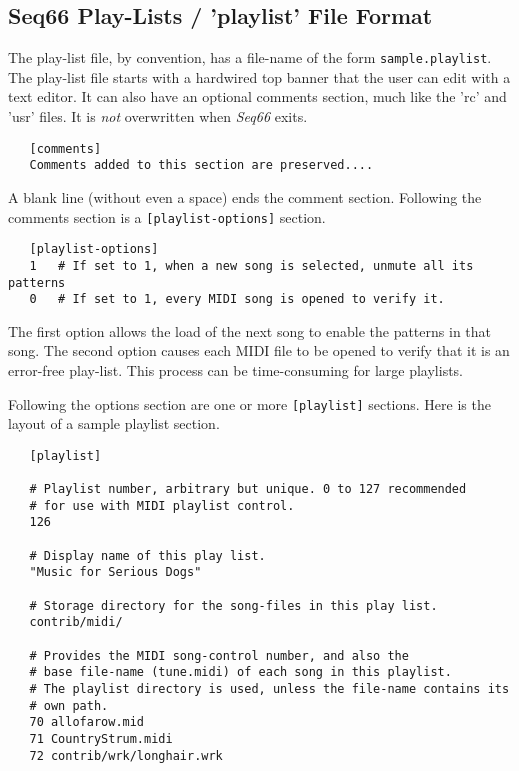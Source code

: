 \subsection{Seq66 Play-Lists / 'playlist' File Format}
\label{subsec:playlist_setup}

   The play-list file, by convention, has a file-name of the form
   \texttt{sample.playlist}.
   The play-list file starts with a hardwired top banner that the user can edit
   with a text editor.  It can also have an optional comments section, much
   like the 'rc' and 'usr' files.  It is \textsl{not} overwritten
   when \textsl{Seq66} exits.

   \begin{verbatim}
   [comments]
   Comments added to this section are preserved....
   \end{verbatim}

   A blank line (without even a space) ends the comment section.
   Following the comments section is a \texttt{[playlist-options]} section.

   \begin{verbatim}
   [playlist-options]
   1   # If set to 1, when a new song is selected, unmute all its patterns
   0   # If set to 1, every MIDI song is opened to verify it.
   \end{verbatim}

   The first option allows the load of the next song to enable the patterns in
   that song.
   The second option causes each MIDI file to be opened to verify that it is an
   error-free play-list.  This process can be time-consuming for large
   playlists.

   Following the options section are one or more \texttt{[playlist]} sections.
   Here is the layout of a sample playlist section.

   \begin{verbatim}
   [playlist]

   # Playlist number, arbitrary but unique. 0 to 127 recommended
   # for use with MIDI playlist control.
   126

   # Display name of this play list.
   "Music for Serious Dogs"

   # Storage directory for the song-files in this play list.
   contrib/midi/

   # Provides the MIDI song-control number, and also the
   # base file-name (tune.midi) of each song in this playlist.
   # The playlist directory is used, unless the file-name contains its
   # own path.
   70 allofarow.mid
   71 CountryStrum.midi
   72 contrib/wrk/longhair.wrk
   \end{verbatim}

